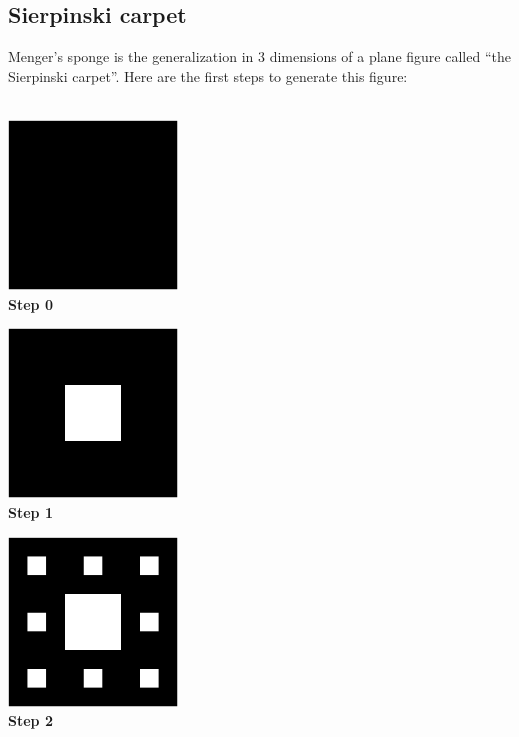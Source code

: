 \subsection{Sierpinski carpet}
\noindent Menger's sponge is the generalization in 3 dimensions of a plane figure called ``the Sierpinski carpet''. Here are the first steps to generate this figure:\\ \\
\begin{minipage}{4.5cm}
\begin{center}
 \includegraphics[width=4.5cm]{pics/carpet0.png}\\
\textbf{Step 0}
\end{center}
\end{minipage}
\begin{minipage}{4.5cm}
\begin{center}
 \includegraphics[width=4.5cm]{pics/carpet1.png}\\
\textbf{Step 1}
\end{center}
\end{minipage}
\begin{minipage}{4.5cm}
\begin{center}
 \includegraphics[width=4.5cm]{pics/carpet2.png}\\
\textbf{Step 2}
\end{center}
\end{minipage}
